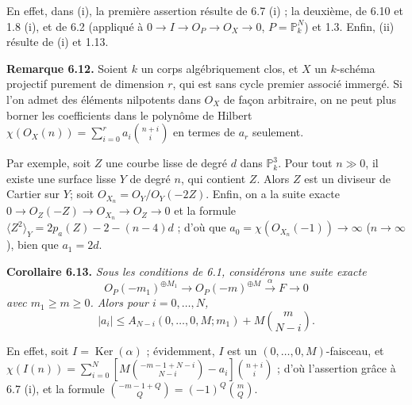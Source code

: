 
En effet, dans (i), la premi\`ere assertion r\'esulte de 6.7 (i) ; la deuxi\`eme, de 6.10 et 1.8 (i), et de 6.2 (appliqu\'e \`a $0\to I\to{O}_P\to{O}_X\to0$, $P=\mathbb P^N_k$) et 1.3. Enfin, (ii) r\'esulte de (i) et 1.13.

\textbf{Remarque 6.12.} Soient $k$ un corps alg\'ebriquement clos, et $X$ un $k$-sch\'ema projectif purement de dimension $r$, qui est sans cycle premier associ\'e immerg\'e. Si l'on admet des \'el\'ements nilpotents dans ${O}_X$ de fa\c{c}on arbitraire, on ne peut plus borner les coefficients dans le polyn\^ome de Hilbert $\chi({O}_X(n))=\sum_{i=0}^{r}a_i\binom{n+i}{i}$ en termes de $a_r$ seulement.

Par exemple, soit $Z$ une courbe lisse de degr\'e $d$ dans $\mathbb P^3_k$. Pour tout $n\gg0$, il existe une surface lisse $Y$ de degr\'e $n$, qui contient $Z$. Alors $Z$ est un diviseur de Cartier sur $Y$; soit ${O}_{X_n}={O}_Y/{O}_Y(-2Z)$. Enfin, on a la suite exacte $0\to{O}_Z(-Z)\to{O}_{X_n}\to{O}_Z\to0$ et la formule $\langle Z^2\rangle_Y=2p_a(Z)-2-(n-4)d$ ; d'o\`u que $a_0=\chi({O}_{X_n}(-1))\to\infty$ ($n\to\infty$), bien que $a_1=2d$.

\textbf{Corollaire 6.13.} \emph{Sous les conditions de 6.1, consid\'erons une suite exacte}
\[
   {O}_P(-m_1)^{\oplus M_1}\longrightarrow
   {O}_P(-m)^{\oplus M}\xrightarrow{\alpha}F\longrightarrow0
\]
\emph{avec $m_1\ge m\ge0$. Alors pour $i=0,\ldots,N$,}
\[
   |a_i|\le A_{N-i}(0,\ldots,0,M;m_1)+M\binom{m}{N-i}.
\]

En effet, soit $I=\operatorname{Ker}(\alpha)$ ; \'evidemment, $I$ est un $(0,\ldots,0,M)$-faisceau, et $\chi(I(n))=\sum_{i=0}^{N}\left[M\binom{-m-1+N-i}{N-i}-a_i\right]\binom{n+i}{i}$ ; d'o\`u l'assertion gr\^ace \`a 6.7 (i), et la formule $\binom{-m-1+Q}{Q}=(-1)^Q\binom{m}{Q}$.

